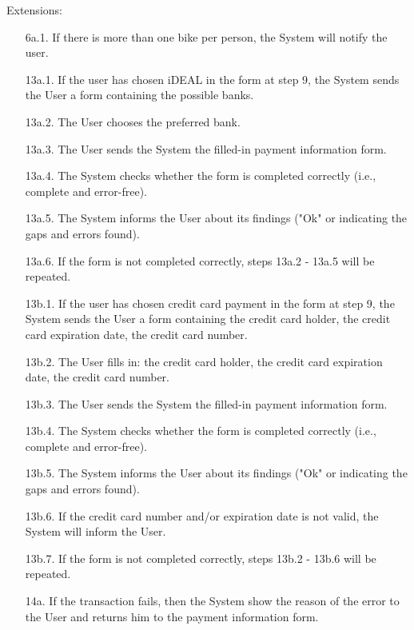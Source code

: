 Extensions:
\begin{enumerate}
    \item[6a.1.] If there is more than one bike per person, the System will notify the user.
    \item[] \phantom{x}
    
    \item[13a.1.] If the user has chosen iDEAL in the form at step 9, the System sends the User a form containing the possible banks.
    \item[13a.2.] The User chooses the preferred bank.
    \item[13a.3.] The User sends the System the filled-in payment information form.
    \item[13a.4.] The System checks whether the form is completed correctly (i.e., complete and error-free).
    \item[13a.5.] The System informs the User about its findings ("Ok" or indicating the gaps and errors found).
    \item[13a.6.] If the form is not completed correctly, steps 13a.2 - 13a.5 will be repeated.
    \item[] \phantom{x}
    
    \item[13b.1.] If the user has chosen credit card payment in the form at step 9, the System sends the User a form containing the credit card holder, the credit card expiration date, the credit card number.
    \item[13b.2.] The User fills in: the credit card holder, the credit card expiration date, the credit card number.
    \item[13b.3.] The User sends the System the filled-in payment information form.
    \item[13b.4.] The System checks whether the form is completed correctly (i.e., complete and error-free).
    \item[13b.5.] The System informs the User about its findings ("Ok" or indicating the gaps and errors found).
    \item[13b.6.] If the credit card number and/or expiration date is not valid, the System will inform the User.
    \item[13b.7.] If the form is not completed correctly, steps 13b.2 - 13b.6 will be repeated.
    \item[] \phantom{x}
    
    \item[14a.] If the transaction fails, then the System show the reason of the error to the User and returns him to the payment information form.
\end{enumerate}

